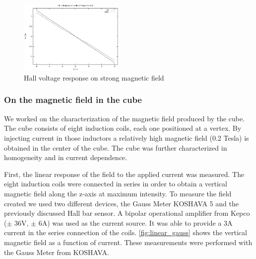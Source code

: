 \documentclass[journal]{IEEEtran}
\begin{document}
\begin{figure}[h]
\centering
\includegraphics[width=0.45\textwidth]{tension_hall_fonction_champ_6T.eps}
\caption{Hall voltage response on strong magnetic field}
\label{fig:hall_champ_6}
\end{figure}








\subsubsection{On the magnetic field in the cube}

We worked on the characterization of the magnetic field produced by the cube. The cube consists of eight induction coils, each one positioned at a vertex. By injecting current in those inductors a relatively high magnetic field (0.2 Tesla) is obtained in the center of the cube. The cube was further characterized in homogeneity and in current dependence.



First, the linear response of the field to the applied current was measured. The eight induction coils were connected in series in order to obtain a vertical magnetic field along the z-axis at maximum intensity. To measure the field created we used two different devices, the Gauss Meter KOSHAVA 5 and the previously discussed Hall bar sensor. A bipolar operational amplifier from Kepco ($\pm$ 36V, $\pm$ 6A) was used as the current source. It was able to provide a 3A current in the series connection of the coils. \figurename \ref{fig:linear_gauss} shows the vertical magnetic field as a function of current. These measurements were performed with the Gauss Meter from KOSHAVA.
\end{document}
